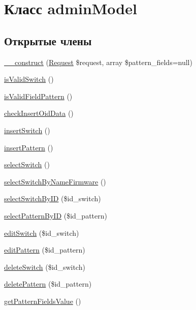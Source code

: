 \hypertarget{classadmin_model}{\section{Класс admin\-Model}
\label{classadmin_model}
}
\subsection*{Открытые члены}
\begin{DoxyCompactItemize}
\item 
\hyperlink{classadmin_model_a1ccb28c3b18d4c5be588fee5fb49d03a}{\-\_\-\-\_\-construct} (\hyperlink{class_request}{Request} \$request, array \$pattern\-\_\-fields=null)
\item 
\hyperlink{classadmin_model_ae6200b0ddcbce08e8476b0704d4aa203}{is\-Valid\-Switch} ()
\item 
\hyperlink{classadmin_model_a8d26b64590b0f353c0ed9c2312473023}{is\-Valid\-Field\-Pattern} ()
\item 
\hyperlink{classadmin_model_a603807dbc8de64a7b6f690baa8d05b34}{check\-Insert\-Oid\-Data} ()
\item 
\hyperlink{classadmin_model_a3aae4149c7fed2165754b0f7b4da35a2}{insert\-Switch} ()
\item 
\hyperlink{classadmin_model_a53b7b03eb468bd378cdc5c0077e00d3d}{insert\-Pattern} ()
\item 
\hyperlink{classadmin_model_ad7be3392eeda63d39b61cbd6cdfcf046}{select\-Switch} ()
\item 
\hyperlink{classadmin_model_a94c19717b6cc43f904d04e88dac324d5}{select\-Switch\-By\-Name\-Firmware} ()
\item 
\hyperlink{classadmin_model_a886c60eae2d65d7e030ce86f8b7d1641}{select\-Switch\-By\-I\-D} (\$id\-\_\-switch)
\item 
\hyperlink{classadmin_model_aca44164fba29f506cb9ec0ea706072b3}{select\-Pattern\-By\-I\-D} (\$id\-\_\-pattern)
\item 
\hyperlink{classadmin_model_af26cb48d302aa8379acbb4f638b4e26f}{edit\-Switch} (\$id\-\_\-switch)
\item 
\hyperlink{classadmin_model_a898e504409c304470890e25a5673295f}{edit\-Pattern} (\$id\-\_\-pattern)
\item 
\hyperlink{classadmin_model_a02146a7ee4437df5d8526bdcddd72998}{delete\-Switch} (\$id\-\_\-switch)
\item 
\hyperlink{classadmin_model_a1d302d77f014aeaf0b313ab439504a33}{delete\-Pattern} (\$id\-\_\-pattern)
\item 
\hyperlink{classadmin_model_a573d43eeee3b961db22cc05cbdd5d26a}{get\-Pattern\-Fields\-Value} ()
\end{DoxyCompactItemize}
